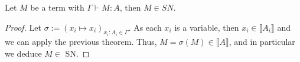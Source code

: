 \documentclass[]{StandardTemplate}
\begin{document}
\begin{cor}[]
Let $ M $ be a term with $ \Gamma \vdash M : A $, then $ M \in SN $.
\end{cor}
\begin{proof}
Let $ \sigma := (x_i \mapsto x_i)_{x_i: A_i \in \Gamma} $. As each $ x_i $ is a variable, then $ x_i \in \llbracket A_i \rrbracket $ and we can apply the previous theorem. Thus, $ M = \sigma(M) \in \llbracket A \rrbracket $, and in particular we deduce $ M \in $ SN.
\end{proof}
\end{document}

